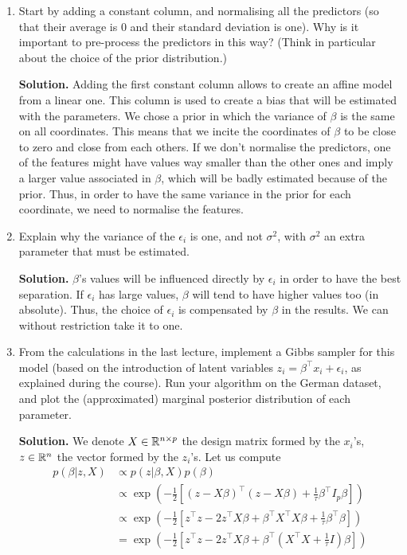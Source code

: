 \documentclass[a4paper, 11pt]{article}
\begin{document}
\begin{enumerate}
    \item Start by adding a constant column, and normalising all the predictors (so that their average is $0$ and their standard deviation is one). Why is it important to pre-process the predictors in this way? (Think in particular about the choice of the prior distribution.)
    
    \textbf{Solution.}
    Adding the first constant column allows to create an affine model from a linear one. This column is used to create a bias that will be estimated with the parameters. We chose a prior in which the variance of $\beta$ is the same on all coordinates. This means that we incite the coordinates of $\beta$ to be close to zero and close from each others. If we don't normalise the predictors, one of the features might have values way smaller than the other ones and imply a larger value associated in $\beta$, which will be badly estimated because of the prior. Thus, in order to have the same variance in the prior for each coordinate, we need to normalise the features. 
    
    
    \item Explain why the variance of the $\epsilon_i$ is one, and not $\sigma^2$, with $\sigma^2$ an extra parameter that must be estimated.
    
    \textbf{Solution.}
    $\beta$'s values will be influenced directly by $\epsilon_i$ in order to have the best separation. If $\epsilon_i$ has large values, $\beta$ will tend to have higher values too (in absolute). Thus, the choice of $\epsilon_i$ is compensated by $\beta$ in the results. We can without restriction take it to one. 
    
    
    
    \item From the calculations in the last lecture, implement a Gibbs sampler for this model (based on the introduction of latent variables $z_i = \beta^\top x_i + \epsilon_i$, as explained during the course). Run your algorithm on the German dataset, and plot the (approximated) marginal posterior distribution of each parameter.
    
    \textbf{Solution.} We denote $X \in \mathbb{R}^{n \times p}$ the design matrix formed by the $x_i$'s, $z \in \mathbb{R}^n$ the vector formed by the $z_i$'s. Let us compute 
\begin{equation*}
    \begin{aligned}
    p \left( \beta | z, X \right) &\propto p(z | \beta, X) p(\beta) \\
    &\propto \exp \left( - \frac{1}{2} \left[ \left( z - X \beta \right)^\top \left( z - X \beta \right) + \frac{1}{\tau} \beta^\top I_p \beta \right] \right) \\
    &\propto \exp \left( - \frac{1}{2} \left[ z^\top z - 2 z^\top X \beta + \beta^\top X^\top X \beta + \frac{1}{\tau} \beta^\top \beta \right] \right) \\
    &= \exp \left( - \frac{1}{2} \left[ z^\top z - 2 z^\top X \beta + \beta^\top \left( X^\top X + \frac{1}{\tau} I \right) \beta \right] \right) \\
    \end{aligned}
\end{equation*}


\end{enumerate}
\end{document}
